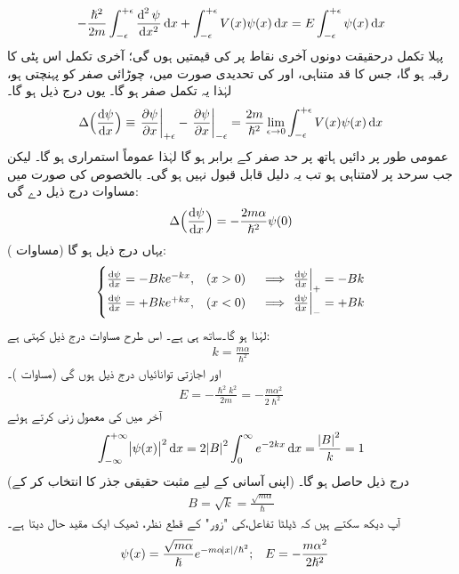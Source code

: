 \begin{align}
-\frac{\hslash^2}{2m}\int_{-\epsilon}^{+\epsilon}\frac{\dif^{\,2}\psi}{\dif x^2}\dif x+\int_{-\epsilon}^{+\epsilon}V(x)\psi(x)\dif x=E\int_{-\epsilon}^{+\epsilon}\psi(x)\dif x
\end{align}
پہلا تکمل درحقیقت دونوں آخری نقاط پر  کی قیمتیں ہوں گی؛ آخری تکمل اس پٹی کا رقبہ ہو گا، جس کا قد متناہی، اور  کی تحدیدی صورت میں، چوڑائی صفر کو پہنچتی ہو، لہٰذا یہ تکمل صفر ہو گا۔ یوں درج ذیل ہو گا۔
\begin{align}
\Delta\Big(\frac{\dif\psi}{\dif x}\Big)\equiv \left.\frac{\partial \psi}{\partial x}\right|_{+\epsilon}-\left.\frac{\partial \psi}{\partial x}\right|_{-\epsilon}=\frac{2m}{\hslash^2}\lim_{\epsilon\to0}\int_{-\epsilon}^{+\epsilon}V(x)\psi(x)\dif x
\end{align}
 عمومی طور پر دائیں ہاتھ پر حد صفر کے برابر ہو گا لہٰذا  عموماً استمراری ہو گا۔ لیکن جب سرحد پر  لامتناہی ہو تب یہ دلیل قابل قبول نہیں ہو گی۔ بالخصوص  کی صورت میں مساوات  درج ذیل دے گی: 
\begin{align}\label{مساوات_شروڈنگر_مبدا_پر_تفرقات_کا_فرق}
\Delta\Big(\frac{\dif \psi}{\dif x}\Big)=-\frac{2m\alpha}{\hslash^2}\psi(0)
\end{align}
یہاں درج ذیل ہو گا (مساوات ):
\begin{align*}
\begin{cases}
\frac{\dif \psi}{\dif x}=-Bke^{-kx},&(x>0)\quad \implies \left.\frac{\dif\psi}{\dif x}\right|_{+}=-Bk\\
\frac{\dif \psi}{\dif x}=+Bke^{+kx},&(x<0)\quad \implies \left.\frac{\dif\psi}{\dif x}\right|_{-}=+Bk
\end{cases}
\end{align*}
لہٰذا  ہو گا۔ساتھ ہی  ہے۔ اس طرح مساوات  درج ذیل کہتی ہے:
\begin{align}
k=\frac{m\alpha}{\hslash^2 }
\end{align}
اور اجازتی توانائیاں درج ذیل ہوں گی (مساوات )۔
\begin{align}
E=-\frac{\hslash^2 k^2}{2m}=-\frac{m\alpha^2}{2\hslash^2}
\end{align}
 آخر میں  کی معمول زنی کرتے    ہوئے 
\begin{align*}
\int_{-\infty}^{+\infty}\abs{\psi(x)}^2\dif x=2\abs{B}^2\int_0^{\infty}e^{-2kx}\dif x=\frac{\abs{B}^2}{k}=1
\end{align*}
 (اپنی آسانی کے لیے مثبت حقیقی جذر کا انتخاب کر کے) درج ذیل حاصل ہو گا۔
\begin{align}
B=\sqrt{k}=\frac{\sqrt{m\alpha}}{\hslash}
\end{align}
آپ دیکھ سکتے ہیں کہ ڈیلٹا تفاعل،کی "زور"  کے قطع نظر، ٹھیک ایک مقید حال دیتا ہے۔ 
\begin{align}\label{مساوات_شروڈنگر_مقید_حال_ڈیلٹا}
\psi(x)&=\frac{\sqrt{m\alpha}}{\hslash}e^{-m\alpha\abs{x}/\hslash^2};&&E=-\frac{m\alpha^2}{2\hslash^2}
\end{align}

